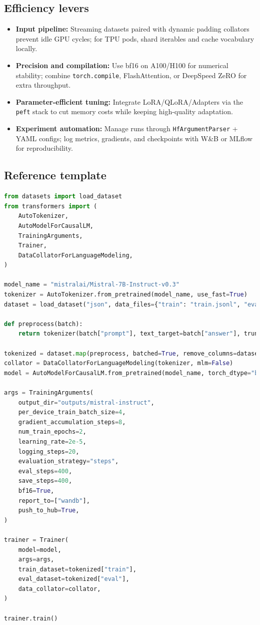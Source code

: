 \documentclass{article}
\begin{document}
\subsection{Efficiency levers}
\begin{itemize}
  \item \textbf{Input pipeline:} Streaming datasets paired with dynamic padding collators prevent idle GPU cycles; for TPU pods, shard iterables and cache vocabulary locally.
  \item \textbf{Precision and compilation:} Use bf16 on A100/H100 for numerical stability; combine \texttt{torch.compile}, FlashAttention, or DeepSpeed ZeRO for extra throughput.
  \item \textbf{Parameter-efficient tuning:} Integrate LoRA/QLoRA/Adapters via the \texttt{peft} stack to cut memory costs while keeping high-quality adaptation.
  \item \textbf{Experiment automation:} Manage runs through \texttt{HfArgumentParser} + YAML configs; log metrics, gradients, and checkpoints with W\&B or MLflow for reproducibility.
\end{itemize}

\subsection{Reference template}
\begin{lstlisting}[language=Python,caption={Instruction tuning with Hugging Face Trainer}]
from datasets import load_dataset
from transformers import (
    AutoTokenizer,
    AutoModelForCausalLM,
    TrainingArguments,
    Trainer,
    DataCollatorForLanguageModeling,
)

model_name = "mistralai/Mistral-7B-Instruct-v0.3"
tokenizer = AutoTokenizer.from_pretrained(model_name, use_fast=True)
dataset = load_dataset("json", data_files={"train": "train.jsonl", "eval": "eval.jsonl"})

def preprocess(batch):
    return tokenizer(batch["prompt"], text_target=batch["answer"], truncation=True)

tokenized = dataset.map(preprocess, batched=True, remove_columns=dataset["train"].column_names)
collator = DataCollatorForLanguageModeling(tokenizer, mlm=False)
model = AutoModelForCausalLM.from_pretrained(model_name, torch_dtype="bfloat16")

args = TrainingArguments(
    output_dir="outputs/mistral-instruct",
    per_device_train_batch_size=4,
    gradient_accumulation_steps=8,
    num_train_epochs=2,
    learning_rate=2e-5,
    logging_steps=20,
    evaluation_strategy="steps",
    eval_steps=400,
    save_steps=400,
    bf16=True,
    report_to=["wandb"],
    push_to_hub=True,
)

trainer = Trainer(
    model=model,
    args=args,
    train_dataset=tokenized["train"],
    eval_dataset=tokenized["eval"],
    data_collator=collator,
)

trainer.train()
\end{lstlisting}
\end{document}
